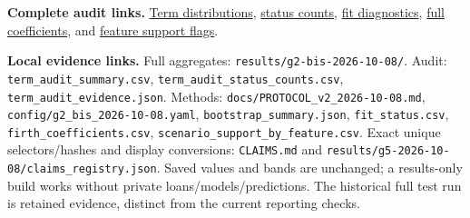 \textbf{Complete audit links.} \href{../results/g2-bis-2026-10-08/term_audit_summary.csv}{Term distributions}, \href{../results/g2-bis-2026-10-08/term_audit_status_counts.csv}{status counts}, \href{../results/g2-bis-2026-10-08/fit_status.csv}{fit diagnostics}, \href{../results/g2-bis-2026-10-08/firth_coefficients.csv}{full coefficients}, and \href{../results/g2-bis-2026-10-08/scenario_support_by_feature.csv}{feature support flags}.\par\textbf{Local evidence links.} Full aggregates: \nolinkurl{results/g2-bis-2026-10-08/}. Audit: \nolinkurl{term_audit_summary.csv}, \nolinkurl{term_audit_status_counts.csv}, \nolinkurl{term_audit_evidence.json}. Methods: \nolinkurl{docs/PROTOCOL_v2_2026-10-08.md}, \nolinkurl{config/g2_bis_2026-10-08.yaml}, \nolinkurl{bootstrap_summary.json}, \nolinkurl{fit_status.csv}, \nolinkurl{firth_coefficients.csv}, \nolinkurl{scenario_support_by_feature.csv}. Exact unique selectors/hashes and display conversions: \nolinkurl{CLAIMS.md} and \nolinkurl{results/g5-2026-10-08/claims_registry.json}. Saved values and bands are unchanged; a results-only build works without private loans/models/predictions. The historical full test run is retained evidence, distinct from the current reporting checks.

